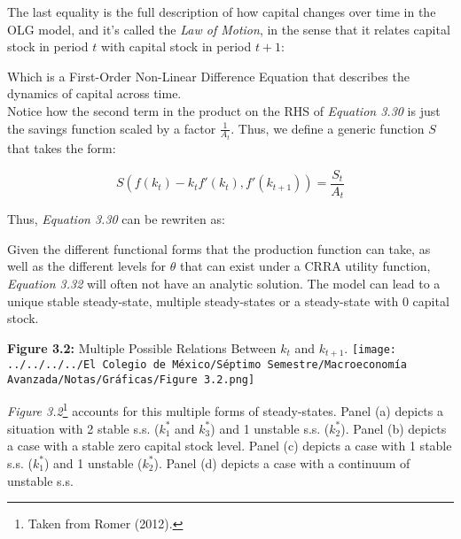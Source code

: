 \bigskip
The last equality is the full description of how capital changes over time in the OLG model, and it's called the \textit{Law of Motion}, in the sense that it relates capital stock in period $t$ with capital stock in period $t+1$:


\bigskip
Which is a First-Order Non-Linear Difference Equation that describes the dynamics of capital across time. \\

Notice how the second term in the product on the RHS of \textit{Equation 3.30} is just the savings function scaled by a factor $\frac{1}{A_t}$. Thus, we define a generic function $S$ that takes the form:

$$S(f(k_t)-k_tf'(k_t),f'(k_{t+1}))=\dfrac{S_t}{A_t}$$

\bigskip
Thus, \textit{Equation 3.30} can be rewriten as:

\bigskip
{}

\bigskip
Given the different functional forms that the production function can take, as well as the different levels for $\theta$ that can exist under a CRRA utility function, \textit{Equation 3.32} will often not have an analytic solution. The model can lead to a unique stable steady-state, multiple steady-states or a steady-state with 0 capital stock.

\bigskip
\begin{center}
\textbf{Figure 3.2:} Multiple Possible Relations Between $k_t$ and $k_{t+1}$.
\texttt{[image: ../../../../El Colegio de México/Séptimo Semestre/Macroeconomía Avanzada/Notas/Gráficas/Figure 3.2.png]} 
\end{center}

\textit{Figure 3.2}\footnote{Taken from Romer (2012).} accounts for this multiple forms of steady-states. Panel (a) depicts a situation with 2 stable s.s. ($k_1^*$ and $k_3^*$) and 1 unstable s.s. ($k_2^*$). Panel (b) depicts a case with a stable zero capital stock level. Panel (c) depicts a case with 1 stable s.s. ($k_1^*$) and 1 unstable ($k_2^*$). Panel (d) depicts a case with a continuum of unstable s.s.\\

